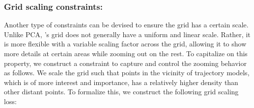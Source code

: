 \documentclass[letterpaper]{article} %
\begin{document}
            
            
            

            
            \subsubsection{Grid scaling constraints:} \label{p:gridscaling}

            Another type of constraints can be devised to ensure the grid has a certain scale. Unlike PCA, \proposedautencoder{}'s grid does not generally have a uniform and linear scale. Rather, it is more flexible with a variable scaling factor across the grid, allowing it to show more details at certain areas while zooming out on the rest. To capitalize on this property, we construct a constraint to capture and control the zooming behavior as follows.
            We scale the grid such that points in the vicinity of trajectory models, which is of more interest and importance, has a relatively higher density than other distant points. 
            To formalize this, we construct the following grid scaling loss:
\end{document}
